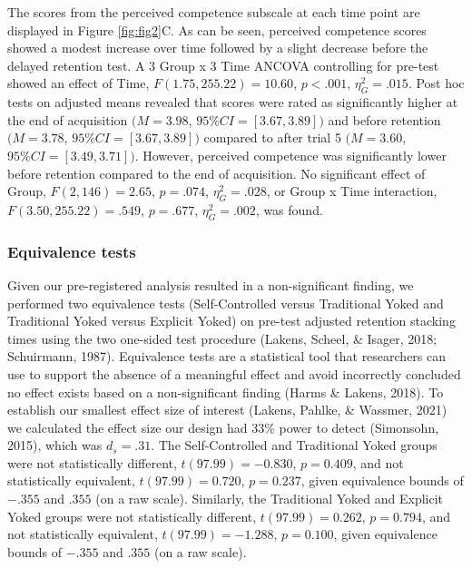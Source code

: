 \documentclass[
  english,
  doc, donotrepeattitle,floatsintext]{apa7}
\begin{document}
The scores from the perceived competence subscale at each time point are displayed in Figure \ref{fig:fig2}C. As can be seen, perceived competence scores showed a modest increase over time followed by a slight decrease before the delayed retention test. A 3 Group x 3 Time ANCOVA controlling for pre-test showed an effect of Time, \(F(1.75,255.22) = 10.60\), \(p < .001\), \(\eta^2_{G} = .015\). Post hoc tests on adjusted means revealed that scores were rated as significantly higher at the end of acquisition \((M = 3.98\), \(95\%CI = [3.67,3.89])\) and before retention \((M = 3.78\), \(95\%CI = [3.67,3.89])\) compared to after trial 5 \((M = 3.60\), \(95\%CI = [3.49,3.71])\). However, perceived competence was significantly lower before retention compared to the end of acquisition. No significant effect of Group, \(F(2,146) = 2.65\), \(p = .074\), \(\eta^2_{G} = .028\), or Group x Time interaction, \(F(3.50,255.22) = .549\), \(p = .677\), \(\eta^2_{G} = .002\), was found.

\hypertarget{equivalence-tests}{%
\subsubsection{Equivalence tests}\label{equivalence-tests}}

Given our pre-registered analysis resulted in a non-significant finding, we performed two equivalence tests (Self-Controlled versus Traditional Yoked and Traditional Yoked versus Explicit Yoked) on pre-test adjusted retention stacking times using the two one-sided test procedure (Lakens, Scheel, \& Isager, 2018; Schuirmann, 1987). Equivalence tests are a statistical tool that researchers can use to support the absence of a meaningful effect and avoid incorrectly concluded no effect exists based on a non-significant finding (Harms \& Lakens, 2018). To establish our smallest effect size of interest (Lakens, Pahlke, \& Wassmer, 2021) we calculated the effect size our design had 33\% power to detect (Simonsohn, 2015), which was \(d_{s} = .31\). The Self-Controlled and Traditional Yoked groups were not statistically different, \(t(97.99) = -0.830\), \(p = 0.409\), and not statistically equivalent, \(t(97.99) = 0.720\), \(p = 0.237\), given equivalence bounds of \(-.355\) and \(.355\) (on a raw scale). Similarly, the Traditional Yoked and Explicit Yoked groups were not statistically different, \(t(97.99) = 0.262\), \(p = 0.794\), and not statistically equivalent, \(t(97.99) = -1.288\), \(p = 0.100\), given equivalence bounds of \(-.355\) and \(.355\) (on a raw scale).
\end{document}
